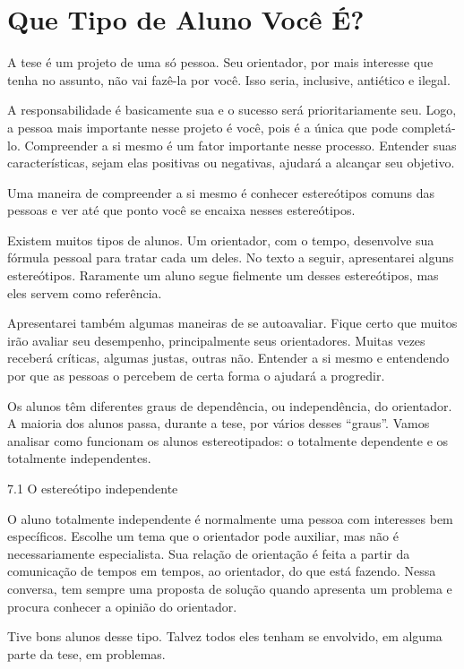 \chapter{Que Tipo de Aluno Você É?}

A tese é um projeto de uma só pessoa. Seu orientador, por mais interesse que tenha no assunto, não vai fazê-la por você. Isso seria, inclusive, antiético e ilegal.


A responsabilidade é basicamente sua e o sucesso será prioritariamente seu. Logo, a pessoa mais importante nesse projeto é você, pois é a única que pode completá-lo. Compreender a si mesmo é um fator importante nesse processo. Entender suas características, sejam elas positivas ou negativas, ajudará a alcançar seu objetivo.


Uma maneira de compreender a si mesmo é conhecer estereótipos comuns das pessoas e ver até que ponto você se encaixa nesses estereótipos. 


Existem muitos tipos de alunos. Um orientador, com o tempo, desenvolve sua fórmula pessoal para tratar cada um deles. No texto a seguir, apresentarei alguns estereótipos. Raramente um aluno segue fielmente um desses estereótipos, mas eles servem como referência.


Apresentarei também algumas maneiras de se autoavaliar. Fique certo que muitos irão avaliar seu desempenho, principalmente seus orientadores. Muitas vezes receberá críticas, algumas justas, outras não. Entender a si mesmo e entendendo por que as pessoas o percebem de certa forma o ajudará a progredir.


Os alunos têm diferentes graus de dependência, ou independência, do orientador. A maioria dos alunos passa, durante a tese, por vários desses “graus”. Vamos analisar como funcionam os alunos estereotipados: o totalmente dependente e os totalmente independentes.


7.1	O estereótipo independente


O aluno totalmente independente é normalmente uma pessoa com interesses bem específicos. Escolhe um tema que o orientador pode auxiliar, mas não é necessariamente especialista. Sua relação de orientação é feita a partir da comunicação de tempos em tempos, ao orientador, do que está fazendo. Nessa conversa, tem sempre uma proposta de solução quando apresenta um problema e procura conhecer a opinião do orientador. 


Tive bons alunos desse tipo. Talvez todos eles tenham se envolvido, em alguma parte da tese, em problemas.


